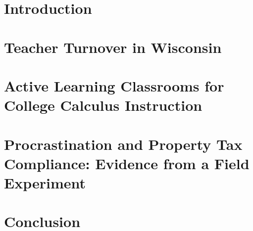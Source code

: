 \documentclass[12pt]{report}
\numberwithin{equation}{section}
\newcommand{\doublespaced}{\renewcommand{\baselinestretch}{2}\normalfont}
\newcommand{\singlespaced}{\renewcommand{\baselinestretch}{1}\normalfont}
\newcommand{\draftspaced}{\doublespaced}
\begin{document}
    
    \newpage

    
    \newpage

    
    \newpage

    
    \newpage

    
    \newpage

    \singlespaced
    \tableofcontents
    \newpage

    \listoftables
    \newpage

    \listoffigures
    \newpage

    \draftspaced

    \chapter*{Introduction}
    
    
    \newpage

    \chapter{Teacher Turnover in Wisconsin}
    
    \newpage

    \chapter{Active Learning Classrooms for College Calculus Instruction}
    
    \newpage

    \chapter{Procrastination and Property Tax Compliance: Evidence from a Field Experiment}
    
    \newpage

    \chapter{Conclusion}
    
    \newpage

    
    \newpage

    
    
\end{document}
